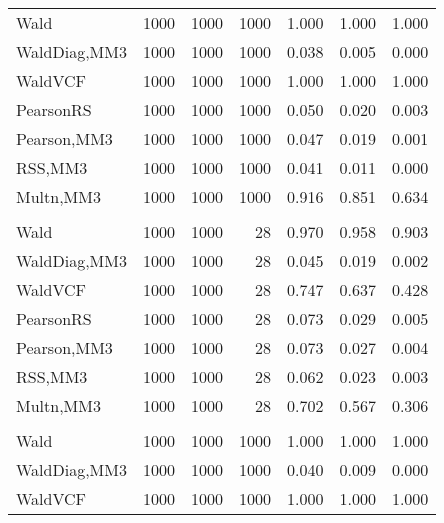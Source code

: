 \documentclass[
]{article}
\begin{document}
\begin{table}[H]
{\begin{tabular}[t]{lrrrrrr}
\hspace{1em}Wald & 1000 & 1000 & 1000 & 1.000 & 1.000 & \vphantom{1} 1.000\\
\hspace{1em}WaldDiag,MM3 & 1000 & 1000 & 1000 & 0.038 & 0.005 & 0.000\\
\hspace{1em}WaldVCF & 1000 & 1000 & 1000 & 1.000 & 1.000 & \vphantom{1} 1.000\\
\hspace{1em}PearsonRS & 1000 & 1000 & 1000 & 0.050 & 0.020 & 0.003\\
\hspace{1em}Pearson,MM3 & 1000 & 1000 & 1000 & 0.047 & 0.019 & 0.001\\
\hspace{1em}RSS,MM3 & 1000 & 1000 & 1000 & 0.041 & 0.011 & 0.000\\
\hspace{1em}Multn,MM3 & 1000 & 1000 & 1000 & 0.916 & 0.851 & 0.634\\
\addlinespace[0.3em]
\multicolumn{7}{l}{\textbf{2F 10V}}\\
\hspace{1em}Wald & 1000 & 1000 & 28 & 0.970 & 0.958 & 0.903\\
\hspace{1em}WaldDiag,MM3 & 1000 & 1000 & 28 & 0.045 & 0.019 & 0.002\\
\hspace{1em}WaldVCF & 1000 & 1000 & 28 & 0.747 & 0.637 & 0.428\\
\hspace{1em}PearsonRS & 1000 & 1000 & 28 & 0.073 & 0.029 & 0.005\\
\hspace{1em}Pearson,MM3 & 1000 & 1000 & 28 & 0.073 & 0.027 & 0.004\\
\hspace{1em}RSS,MM3 & 1000 & 1000 & 28 & 0.062 & 0.023 & 0.003\\
\hspace{1em}Multn,MM3 & 1000 & 1000 & 28 & 0.702 & 0.567 & 0.306\\
\addlinespace[0.3em]
\multicolumn{7}{l}{\textbf{3F 15V}}\\
\hspace{1em}Wald & 1000 & 1000 & 1000 & 1.000 & 1.000 & 1.000\\
\hspace{1em}WaldDiag,MM3 & 1000 & 1000 & 1000 & 0.040 & 0.009 & 0.000\\
\hspace{1em}WaldVCF & 1000 & 1000 & 1000 & 1.000 & 1.000 & 1.000\\

\end{tabular}}
\end{table}
\end{document}
